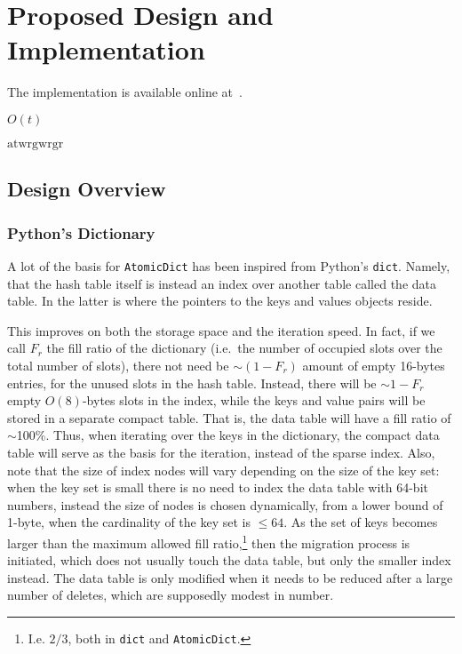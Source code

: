 \chapter{Proposed Design and Implementation}\label{ch:design-and-implementation}

The implementation is available online at~\cite{cereggii}.

\cite{peniocereus-greggii}

$O(t)$

$\textrm{atw} \textrm{rgw} \textrm{rgr}$

\section{Design Overview}\label{sec:design-overview}


\subsection{Python's Dictionary}\label{subsec:python-dict}

A lot of the basis for \texttt{AtomicDict} has been inspired from Python's \texttt{dict}.
Namely, that the hash table itself is instead an index over another table called the data table.
In the latter is where the pointers to the keys and values objects reside.

This improves on both the storage space and the iteration speed.
In fact, if we call $F_r$ the fill ratio of the dictionary (i.e.\ the number of occupied slots over the total number of slots), there not need be $\sim(1 - F_r)$ amount of empty 16-bytes entries, for the unused slots in the hash table.
Instead, there will be $\sim1 - F_r$ empty $O(8)$-bytes slots in the index, while the keys and value pairs will be stored in a separate compact table.
That is, the data table will have a fill ratio of $\sim$100\%.
Thus, when iterating over the keys in the dictionary, the compact data table will serve as the basis for the iteration, instead of the sparse index.
Also, note that the size of index nodes will vary depending on the size of the key set: when the key set is small there is no need to index the data table with 64-bit numbers, instead the size of nodes is chosen dynamically, from a lower bound of 1-byte, when the cardinality of the key set is $\leq 64$.
As the set of keys becomes larger than the maximum allowed fill ratio,\footnote{%
	I.e. $2/3$, both in \texttt{dict} and \texttt{AtomicDict}.
} then the migration process is initiated, which does not usually touch the data table, but only the smaller index instead.
The data table is only modified when it needs to be reduced after a large number of deletes, which are supposedly modest in number.

